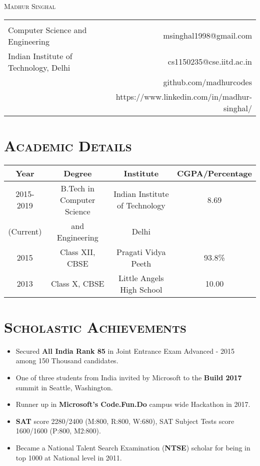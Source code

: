 \documentclass{article}
\newcommand{\tmpsection}[1]{}
\let\tmpsection=\section
\renewcommand{\section}[1]{\tmpsection*{\textsc{#1}}}
\begin{document}

\begin{center}
 {\Large \textsc{Madhur Singhal} }\\ 
\begin{tabular}{ l p{4cm} r }
    & &   \\
  Computer Science and Engineering & & msinghal1998@gmail.com \\
  Indian Institute of Technology, Delhi & & cs1150235@cse.iitd.ac.in \\
  & & github.com/madhurcodes \\ & & https://www.linkedin.com/in/madhur-singhal/\\
\end{tabular}
\end{center}


\section{Academic Details}

\begin{center}
\begin{tabular}{ |c | c | c | c |}
\hline
Year & Degree & Institute & CGPA/Percentage \\ 
\hline
2015-2019 & B.Tech in Computer Science & Indian Institute of Technology & 8.69 \\ 
(Current) & and Engineering & Delhi & \\
\hline

2015 & Class XII, CBSE & Pragati Vidya Peeth & 93.8\% \\ 

\hline
2013 & Class X, CBSE & Little Angels High School & 10.00 \\  \hline
\end{tabular}
\end{center}


\section{Scholastic Achievements}
\begin{itemize}
    \setlength\itemsep{0.0em}
    \item Secured \textbf{All India Rank 85} in Joint Entrance Exam Advanced - 2015 among 150 Thousand candidates.
    \item One of three students from India invited by Microsoft to the \textbf{Build 2017} summit in Seattle, Washington.
    \item Runner up in \textbf{Microsoft's Code.Fun.Do} campus wide Hackathon in 2017.   
    \item \textbf{SAT} score 2280/2400 (M:800, R:800, W:680), SAT Subject Tests score 1600/1600 (P:800, M2:800). 
    \item Became a National Talent Search Examination (\textbf{NTSE}) scholar for being in top 1000 at National level in 2011.
\end{itemize}
\end{document}
